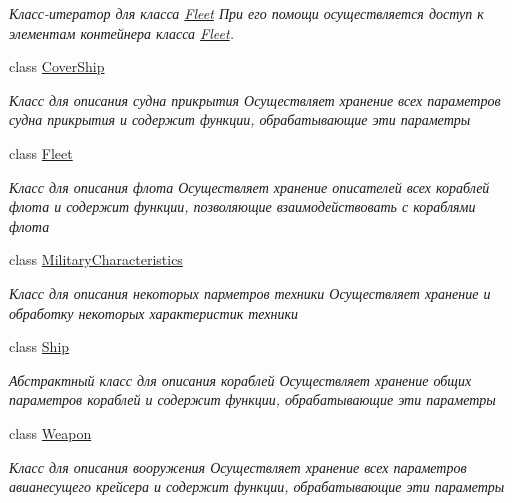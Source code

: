 \begin{DoxyCompactItemize}
\begin{DoxyCompactList}\small\item\em Класс-\/итератор для класса \mbox{\hyperlink{class_aircraft_carrier_group_1_1_fleet}{Fleet}}  При его помощи осуществляется доступ к элементам контейнера класса \mbox{\hyperlink{class_aircraft_carrier_group_1_1_fleet}{Fleet}}. \end{DoxyCompactList}\item 
class \mbox{\hyperlink{class_aircraft_carrier_group_1_1_cover_ship}{Cover\+Ship}}
\begin{DoxyCompactList}\small\item\em Класс для описания судна прикрытия  Осуществляет хранение всех параметров судна прикрытия и содержит функции, обрабатывающие эти параметры \end{DoxyCompactList}\item 
class \mbox{\hyperlink{class_aircraft_carrier_group_1_1_fleet}{Fleet}}
\begin{DoxyCompactList}\small\item\em Класс для описания флота  Осуществляет хранение описателей всех кораблей флота и содержит функции, позволяющие взаимодействовать с кораблями флота \end{DoxyCompactList}\item 
class \mbox{\hyperlink{class_aircraft_carrier_group_1_1_military_characteristics}{Military\+Characteristics}}
\begin{DoxyCompactList}\small\item\em Класс для описания некоторых парметров техники  Осуществляет хранение и обработку некоторых характеристик техники \end{DoxyCompactList}\item 
class \mbox{\hyperlink{class_aircraft_carrier_group_1_1_ship}{Ship}}
\begin{DoxyCompactList}\small\item\em Абстрактный класс для описания кораблей  Осуществляет хранение общих параметров кораблей и содержит функции, обрабатывающие эти параметры \end{DoxyCompactList}\item 
class \mbox{\hyperlink{class_aircraft_carrier_group_1_1_weapon}{Weapon}}
\begin{DoxyCompactList}\small\item\em Класс для описания вооружения  Осуществляет хранение всех параметров авианесущего крейсера и содержит функции, обрабатывающие эти параметры \end{DoxyCompactList}\end{DoxyCompactItemize}
